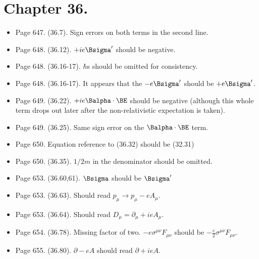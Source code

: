 \section{Chapter 36.}
\begin{itemize}
\item Page 647.  (36.7).  Sign errors on both terms in the second line.
\item Page 648.  (36.12).  $+i e \Bsigma'$ should be negative.
\item Page 648.  (36.16-17).  $\hbar$s should be omitted for consistency.
\item Page 648.  (36.16-17).  It appears that the $- e \Bsigma'$ should be $+ e \Bsigma'$.
\item Page 649.  (36.22).  $+i e \Balpha \cdot \BE$ should be negative (although this whole term drops out later after the non-relativistic expectation is taken).
\item Page 649.  (36.25).  Same sign error on the $\Balpha \cdot \BE$ term.
\item Page 650.  Equation reference to (36.32) should be (32.31)
\item Page 650.  (36.35).  $1/2m$ in the denominator should be omitted.
\item Page 653.  (36.60,61).  $\Bsigma$ should be $\Bsigma'$
\item Page 653.  (36.63).  Should read $p_\mu \rightarrow p_\mu - e A_\mu$.
\item Page 653.  (36.64).  Should read $D_\mu = \partial_\mu + i e A_\mu$.
\item Page 654.  (36.78).  Missing factor of two.  $-e \sigma^{\mu\nu} F_{\mu\nu}$ should be $-\frac{e}{2} \sigma^{\mu\nu} F_{\mu\nu}$.
\item Page 655.  (36.80).  $\partial - e A$ should read $\partial + i e A$.
\end{itemize}

\EndArticle
